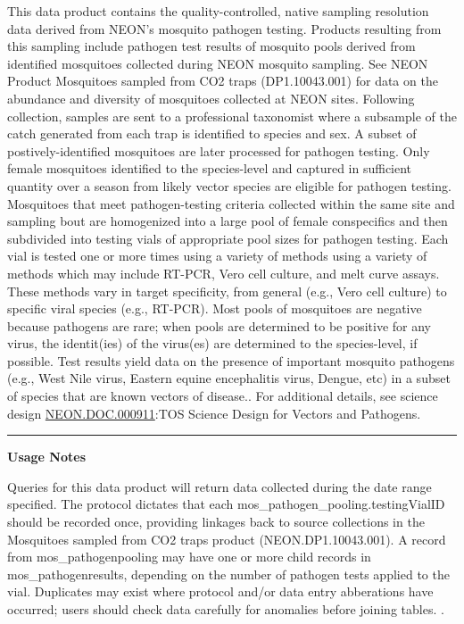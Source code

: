 \documentclass[]{article}
\begin{document}
This data product contains the quality-controlled, native sampling
resolution data derived from NEON's mosquito pathogen testing. Products
resulting from this sampling include pathogen test results of mosquito
pools derived from identified mosquitoes collected during NEON mosquito
sampling. See NEON Product Mosquitoes sampled from CO2 traps
(DP1.10043.001) for data on the abundance and diversity of mosquitoes
collected at NEON sites. Following collection, samples are sent to a
professional taxonomist where a subsample of the catch generated from
each trap is identified to species and sex. A subset of
postively-identified mosquitoes are later processed for pathogen
testing. Only female mosquitoes identified to the species-level and
captured in sufficient quantity over a season from likely vector species
are eligible for pathogen testing. Mosquitoes that meet pathogen-testing
criteria collected within the same site and sampling bout are
homogenized into a large pool of female conspecifics and then subdivided
into testing vials of appropriate pool sizes for pathogen testing. Each
vial is tested one or more times using a variety of methods using a
variety of methods which may include RT-PCR, Vero cell culture, and melt
curve assays. These methods vary in target specificity, from general
(e.g., Vero cell culture) to specific viral species (e.g., RT-PCR). Most
pools of mosquitoes are negative because pathogens are rare; when pools
are determined to be positive for any virus, the identit(ies) of the
virus(es) are determined to the species-level, if possible. Test results
yield data on the presence of important mosquito pathogens (e.g., West
Nile virus, Eastern equine encephalitis virus, Dengue, etc) in a subset
of species that are known vectors of disease.. For additional details,
see science design
\href{htttp://data.neonscience.org/api/v0/documents/NEON.DOC.000911vA}{NEON.DOC.000911}:TOS
Science Design for Vectors and Pathogens.

\begin{center}\rule{0.5\linewidth}{\linethickness}\end{center}

\textbf{Usage Notes}

Queries for this data product will return data collected during the date
range specified. The protocol dictates that each
mos\_pathogen\_pooling.testingVialID should be recorded once, providing
linkages back to source collections in the Mosquitoes sampled from CO2
traps product (NEON.DP1.10043.001). A record from mos\_pathogenpooling
may have one or more child records in mos\_pathogenresults, depending on
the number of pathogen tests applied to the vial. Duplicates may exist
where protocol and/or data entry abberations have occurred; users should
check data carefully for anomalies before joining tables. \newpage
.
\end{document}
